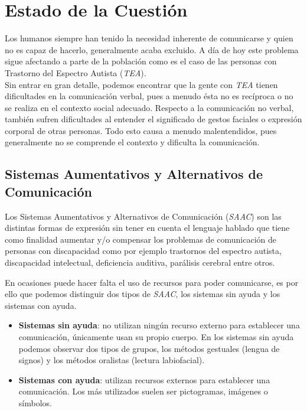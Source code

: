 \chapter{Estado de la Cuestión}
\label{cap:estadoDeLaCuestion}


Los humanos siempre  han tenido la necesidad inherente de comunicarse y quien no es capaz de hacerlo, generalmente acaba excluido. A día de hoy este problema sigue afectando a parte de la población como es el caso de las personas con Trastorno del Espectro Autista (\textit{TEA}).
\\

Sin entrar en gran detalle, podemos encontrar que la gente con \textit{TEA} tienen dificultades en la comunicación verbal, pues a menudo ésta no es recíproca o no se realiza en el contexto social adecuado. Respecto a la comunicación no verbal, también sufren dificultades al entender el significado de gestos faciales o expresión corporal de otras personas. Todo esto causa a menudo malentendidos, pues generalmente no se comprende el contexto y dificulta la comunicación. 


\section{Sistemas Aumentativos y Alternativos de Comunicación}
Los Sistemas Aumentativos y Alternativos de Comunicación (\textit{SAAC}) son las distintas formas de expresión sin tener en cuenta el lenguaje hablado que tiene como finalidad aumentar y/o compensar los problemas de comunicación de personas con discapacidad como por ejemplo trastornos del espectro autista, discapacidad intelectual, deficiencia auditiva, parálisis cerebral entre otros.

En ocasiones puede hacer falta el uso de recursos para poder comunicarse, es por ello que podemos distinguir dos tipos de \textit{SAAC}, los sistemas sin ayuda y los sistemas con ayuda.
\newpage
\begin{itemize}
	\item \textbf{Sistemas sin ayuda}: no utilizan ningún recurso externo para establecer una comunicación, únicamente usan su propio cuerpo. En los sistemas sin ayuda podemos observar dos tipos de grupos, los métodos gestuales (lengua de signos) y los métodos oralistas (lectura labiofacial). 
	\item \textbf{Sistemas con ayuda}: utilizan recursos externos para establecer una comunicación. Los más utilizados suelen ser pictogramas, imágenes o símbolos.
\end{itemize}

